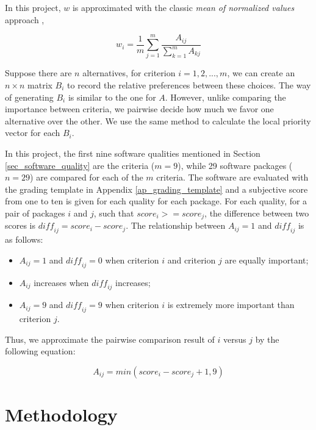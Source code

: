 \documentclass[preprint,12pt,authoryear]{elsarticle}
\begin{document}
In this project, $w$ is approximated with the classic \textit{mean of normalized
values} approach \citep{AlessioEtAl2006},

\begin{equation}
w_i = \frac{1}{m}\sum_{j=1}^{m}\frac{A_{ij}}{\sum_{k=1}^{m}A_{kj}}
\end{equation}

Suppose there are $n$ alternatives, for criterion $i = 1, 2, ... , m$, we can
create an $n\times n$ matrix $B_i$ to record the relative preferences between
these choices. The way of generating $B_i$ is similar to the one for $A$.
However, unlike comparing the importance between criteria, we pairwise decide
how much we favor one alternative over the other. We use the same method to
calculate the local priority vector for each $B_i$.

In this project, the first nine software qualities mentioned in Section
\ref{sec_software_quality} are the criteria ($m = 9$), while 29 software
packages ($n = 29$) are compared for each of the $m$ criteria. The software are
evaluated with the grading template in Appendix \ref{ap_grading_template} and a
subjective score from one to ten is given for each quality for each package. For
each quality, for a pair of packages $i$ and $j$, such that $score_i >=
score_j$, the difference between two scores is $\mathit{diff_{ij}} = score_i -
score_j$. The relationship between $A_{ij} = 1$ and $\mathit{diff_{ij}}$ is as
follows:

\begin{itemize}
\item $A_{ij} = 1$ and $\mathit{diff_{ij}} = 0$ when criterion $i$ and criterion
$j$ are equally important;
\item $A_{ij}$ increases when $\mathit{diff_{ij}}$ increases;
\item $A_{ij} = 9$ and $\mathit{diff_{ij}} = 9$ when criterion $i$ is extremely
more important than criterion $j$.
\end{itemize}

Thus, we approximate the pairwise comparison result of $i$ versus $j$ by the
following equation:

\begin{equation}
A_{ij} = min(score_i - score_j + 1, 9)
\end{equation}

\section{Methodology} \label{ch_methods}
\end{document}
